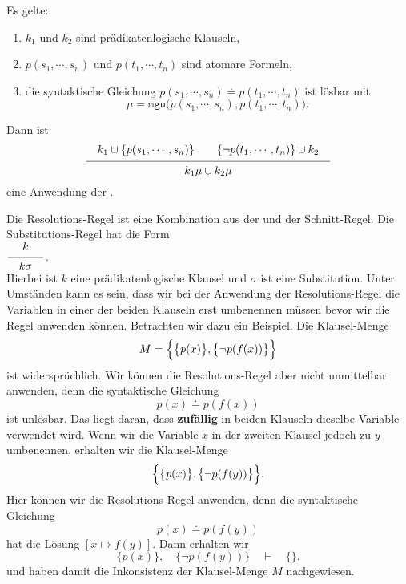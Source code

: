 \begin{Definition} 
    Es gelte:
    \begin{enumerate}
    \item $k_1$ und $k_2$ sind prädikatenlogische Klauseln,
    \item $p(s_1,\cdots,s_n)$ und $p(t_1,\cdots,t_n)$ sind atomare Formeln,
    \item die syntaktische Gleichung $p(s_1,\cdots,s_n)  \doteq p(t_1,\cdots,t_n)$ ist lösbar mit 
          \[ \mu = \mathtt{mgu}\bigl(p(s_1,\cdots,s_n), p(t_1,\cdots,t_n)\bigr). \]
    \end{enumerate}
     Dann ist 
     \[ \schluss{k_1 \cup\{ p(s_1,\cdots,s_n)\} \quad\quad \{\neg p(t_1,\cdots,t_n)\} \cup k_2}{
                 k_1\mu \cup k_2\mu} 
     \]
     eine Anwendung der .
     \eox
\end{Definition}
Die Resolutions-Regel ist eine Kombination aus der  und der 
Schnitt-Regel.  Die Substitutions-Regel hat die Form
\\[0.2cm]
\hspace*{1.3cm}
$\schluss{k}{k\sigma}$. 
\\[0.2cm]
Hierbei ist $k$ eine prädikatenlogische Klausel und $\sigma$ ist eine Substitution.
Unter Umständen kann es sein, dass wir bei der Anwendung der Resolutions-Regel 
die Variablen in einer der beiden Klauseln erst umbenennen
müssen bevor wir die Regel anwenden können.  Betrachten wir dazu ein Beispiel.
Die Klausel-Menge 
\[ M = \Bigl\{ \bigl\{ p(x) \bigr\}, \bigl\{ \neg p(f(x)) \bigr\} \Bigr\} \]
ist widersprüchlich.  Wir können die Resolutions-Regel aber nicht unmittelbar anwenden,
denn die syntaktische Gleichung 
\[ p(x) \doteq p(f(x)) \]
ist unlösbar.  Das liegt daran, dass \textbf{zufällig} in beiden Klauseln dieselbe Variable
verwendet wird.  Wenn wir die Variable $x$ in der zweiten Klausel jedoch zu $y$ umbenennen, erhalten
wir die Klausel-Menge 
\[ \Bigl\{ \bigl\{ p(x) \bigr\}, \bigl\{ \neg p(f(y)) \bigr\} \Bigr\}. \]
Hier können wir die Resolutions-Regel anwenden, denn die syntaktische Gleichung 
\[ p(x) \doteq p(f(y)) \]
hat die Lösung $[x \mapsto f(y)]$.  Dann erhalten wir 
\[ \bigl\{ p(x) \bigr\}, \quad \bigl\{ \neg p(f(y)) \bigr\} \quad \vdash \quad \{\}. \]
und haben damit die Inkonsistenz der Klausel-Menge $M$ nachgewiesen.


